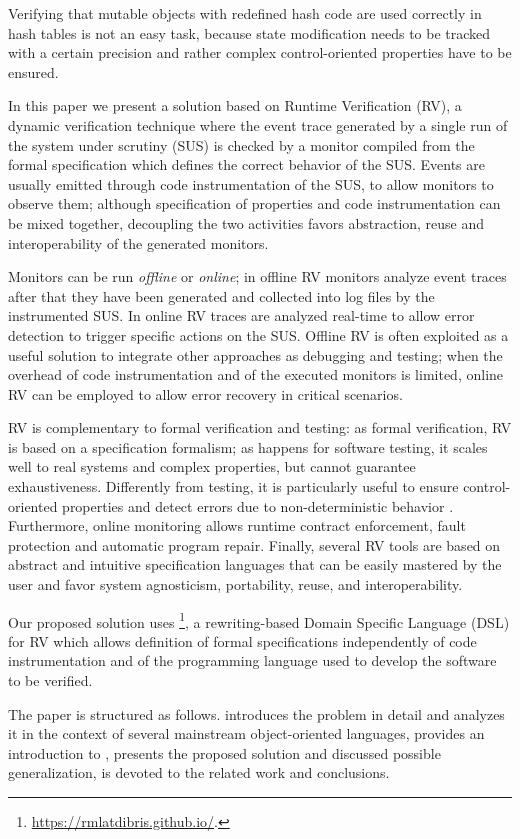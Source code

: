 Verifying that mutable objects with redefined hash code are used correctly in hash tables is not an easy task, because state modification needs to be tracked with a certain precision and rather complex control-oriented properties \cite{AhrendtCPS17} have to be ensured.

In this paper we present a solution based on Runtime Verification (RV), a dynamic verification technique where
the event trace generated by a single run of
the system under scrutiny (SUS) is checked by a monitor compiled from the formal specification which defines the correct behavior
of the SUS.
Events are usually emitted through code instrumentation of the SUS, to allow monitors to observe them;
although specification of properties and code instrumentation can be mixed together, decoupling the two activities favors abstraction, reuse and
interoperability of the generated monitors.

Monitors can be run \emph{offline} or \emph{online};
in offline RV monitors analyze event traces  after that they have been generated and collected into log files
by the instrumented SUS. In online RV traces are analyzed real-time to allow error detection to trigger specific actions on the SUS. 
Offline RV \cite{Colombo2022} is often exploited as a useful solution to integrate other approaches as debugging and testing;  %
when the overhead of code instrumentation and of the executed monitors is limited, online RV can be employed to allow error recovery in critical scenarios. 

RV is complementary to formal verification and testing:
as formal verification, RV is based on a specification formalism; as happens for software testing, it
scales well to real systems and complex properties, but cannot guarantee exhaustiveness.
Differently from testing, it is particularly useful to ensure control-oriented properties 
and detect errors due to non-deterministic behavior \cite{havelund2004,sharma2009}.
Furthermore, online monitoring allows runtime contract enforcement, fault protection and automatic program repair.
Finally, several RV tools are based on abstract and intuitive specification languages that can be easily mastered by the user
and favor system agnosticism, portability, reuse, and interoperability.

Our proposed solution uses \rml\footnote{\href{https://rmlatdibris.github.io/}{https://rmlatdibris.github.io/}.}, a rewriting-based Domain Specific Language (DSL) for RV
which allows definition of formal specifications independently of code instrumentation and of the programming language used
to develop the software to be verified. 

The paper is structured as follows.
 introduces the problem in detail and analyzes it in the context of several mainstream object-oriented languages,
 provides an introduction to \rml,  presents the proposed solution and discussed possible generalization,
 is devoted to the related work and conclusions.
